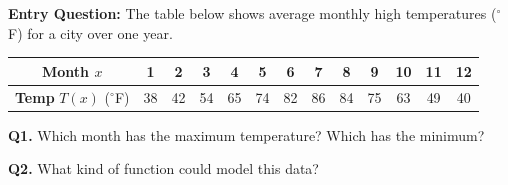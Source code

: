 \documentclass[10pt]{article}
\begin{document}
\vspace{0.08in}

\begin{hookbox}
\textbf{Entry Question:} The table below shows average monthly high
temperatures (${}^\circ$F) for a city over one year.

\vspace{4pt}
\begin{center}
\renewcommand{\arraystretch}{1.3}
\small
\begin{tabular}{|c|c|c|c|c|c|c|c|c|c|c|c|c|}
\hline
\textbf{Month} $x$ & 1 & 2 & 3 & 4 & 5 & 6 & 7 & 8 & 9 & 10 & 11 & 12 \\
\hline
\textbf{Temp} $T(x)$ (${}^\circ$F) & 38 & 42 & 54 & 65 & 74 & 82 & 86 & 84 & 75 & 63 & 49 & 40 \\
\hline
\end{tabular}
\end{center}

\vspace{6pt}
\textbf{Q1.} Which month has the maximum temperature? 
\quad Which has the minimum? 

\vspace{4pt}
\textbf{Q2.} What kind of function could model this data?
\end{hookbox}

\vspace{0.08in}
\end{document}
